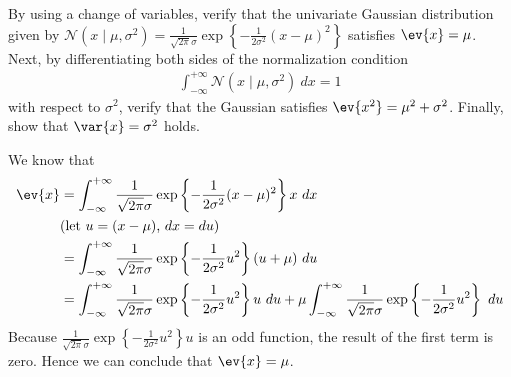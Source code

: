 \begin{question}{1.8}
	By using a change of variables, verify that the univariate Gaussian distribution given by $\mathcal{N}(x \mid \mu, \sigma^2) = \frac{1}{\sqrt{2\pi}\sigma}\exp\left\{ -\frac{1}{2\sigma^2} (x-\mu)^2 \right\}$ satisfies $\ev{x} = \mu$. Next, by differentiating both sides of the normalization condition
	\begin{align*}
		\int_{-\infty}^{+\infty} \mathcal{N}(x \mid \mu, \sigma^2) \ dx = 1
	\end{align*}
	with respect to $\sigma^2$, verify that the Gaussian satisfies $\ev{x^2} = \mu^2 + \sigma^2$. Finally, show that $\var{x} = \sigma^2$ holds.
\end{question}

\begin{answer}{}
	We know that
	\begin{align}
		\ev{x} &= \int_{-\infty}^{+\infty} \frac{1}{\sqrt{2\pi}\sigma}\exp\left\{ -\frac{1}{2\sigma^2} (x-\mu)^2 \right\}x\ dx\\
		&\mbox{(let $u = (x-\mu)$, $dx = du$)} \nonumber\\
		&= \int_{-\infty}^{+\infty} \frac{1}{\sqrt{2\pi}\sigma} \exp\left\{ -\frac{1}{2\sigma^2} u^2 \right\}(u + \mu)\ du\\
		&= \int_{-\infty}^{+\infty} \frac{1}{\sqrt{2\pi}\sigma}  \exp\left\{ -\frac{1}{2\sigma^2} u^2 \right\}u \ du + \mu \int_{-\infty}^{+\infty} \frac{1}{\sqrt{2\pi}\sigma}  \exp\left\{ -\frac{1}{2\sigma^2} u^2 \right\} \ du
	\end{align}
	Because $\frac{1}{\sqrt{2\pi}\sigma}  \exp\left\{ -\frac{1}{2\sigma^2} u^2 \right\}u$ is an odd function, the result of the first term is zero. Hence we can conclude that $\ev{x} = \mu$.
	

\end{answer}
